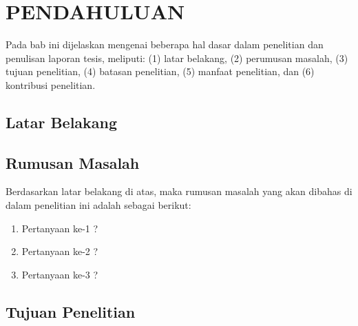%
%
%
%
%

\chapter{PENDAHULUAN}
\label{sec:pendahuluan}

Pada bab ini dijelaskan mengenai beberapa hal dasar dalam penelitian dan penulisan laporan tesis, meliputi: (1) latar belakang, (2) perumusan masalah, (3) tujuan penelitian, (4) batasan penelitian, (5) manfaat penelitian, dan (6) kontribusi penelitian.

\section{Latar Belakang}

\blindtext \citep{bhati2020review}

\section{Rumusan Masalah}

Berdasarkan latar belakang di atas, maka rumusan masalah yang akan dibahas di dalam penelitian ini adalah sebagai berikut:

\begin{enumerate}
    \item Pertanyaan ke-1 ?
    \item Pertanyaan ke-2 ?
    \item Pertanyaan ke-3 ?
\end{enumerate}

\section{Tujuan Penelitian}

\blindtext

